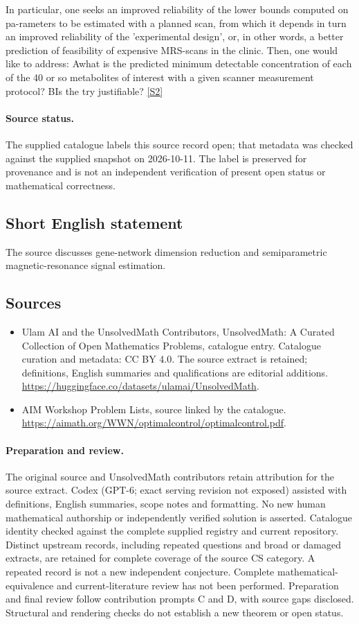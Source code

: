 \documentclass[11pt]{article}
\begin{document}
In particular, one seeks an improved reliability of the lower bounds computed on pa-rameters to be estimated with a planned scan, from which it depends in turn an improved reliability of the 'experimental design', or, in other words, a better prediction of feasibility of expensive MRS-scans in the clinic. Then, one would like to address: Awhat is the predicted minimum detectable concentration of each of the 40 or so metabolites of interest with a given scanner measurement protocol? BIs the try justifiable? \href{https://aimath.org/WWN/optimalcontrol/optimalcontrol.pdf}{[S2]}
\paragraph{Source status.}
The supplied catalogue labels this source record open; that metadata was checked against the supplied snapshot on 2026-10-11. The label is preserved for provenance and is not an independent verification of present open status or mathematical correctness.
\subsection{Short English statement}
The source discusses gene-network dimension reduction and semiparametric magnetic-resonance signal estimation.
\subsection{Sources}
\begin{itemize}
\item[S1] Ulam AI and the UnsolvedMath Contributors, UnsolvedMath: A Curated Collection of Open Mathematics Problems, catalogue entry. Catalogue curation and metadata: CC BY 4.0. The source extract is retained; definitions, English summaries and qualifications are editorial additions.
\url{https://huggingface.co/datasets/ulamai/UnsolvedMath}.
\item[S2] AIM Workshop Problem Lists, source linked by the catalogue.
\url{https://aimath.org/WWN/optimalcontrol/optimalcontrol.pdf}.
\end{itemize}
\paragraph{Preparation and review.}
The original source and UnsolvedMath contributors retain attribution for the source extract. Codex (GPT-6; exact serving revision not exposed) assisted with definitions, English summaries, scope notes and formatting. No new human mathematical authorship or independently verified solution is asserted. Catalogue identity checked against the complete supplied registry and current repository. Distinct upstream records, including repeated questions and broad or damaged extracts, are retained for complete coverage of the source CS category. A repeated record is not a new independent conjecture. Complete mathematical-equivalence and current-literature review has not been performed. Preparation and final review follow contribution prompts C and D, with source gaps disclosed. Structural and rendering checks do not establish a new theorem or open status.
\label{end:statement}
\end{document}
